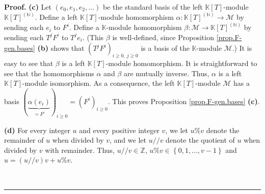 \documentclass[numbers=enddot,12pt,final,onecolumn,notitlepage]{scrartcl}%
\theoremstyle{definition}
\newenvironment{proof}[1][Proof]{\noindent\textbf{#1.} }{\ \rule{0.5em}{0.5em}}
\begin{document}
\begin{proof}
\textbf{(c)} Let $\left(  e_{0},e_{1},e_{2},\ldots\right)  $ be the standard
basis of the left $\mathbb{K}\left[  T\right]  $-module $\mathbb{K}\left[
T\right]  ^{\left(  \mathbb{N}\right)  }$. Define a left $\mathbb{K}\left[
T\right]  $-module homomorphism $\alpha:\mathbb{K}\left[  T\right]  ^{\left(
\mathbb{N}\right)  }\rightarrow\mathcal{M}$ by sending each $e_{i}$ to $F^{i}%
$. Define a $\mathbb{K}$-module homomorphism $\beta:\mathcal{M}\rightarrow
\mathbb{K}\left[  T\right]  ^{\left(  \mathbb{N}\right)  }$ by sending each
$T^{j}F^{i}$ to $T^{j}e_{i}$. (This $\beta$ is well-defined, since Proposition
\ref{prop.F-gen.bases} \textbf{(b)} shows that $\left(  T^{j}F^{i}\right)
_{i\geq0,\ j\geq0}$ is a basis of the $\mathbb{K}$-module $\mathcal{M}$.) It
is easy to see that $\beta$ is a left $\mathbb{K}\left[  T\right]  $-module
homomorphism. It is straightforward to see that the homomorphisms $\alpha$ and
$\beta$ are mutually inverse. Thus, $\alpha$ is a left $\mathbb{K}\left[
T\right]  $-module isomorphism. As a consequence, the left $\mathbb{K}\left[
T\right]  $-module $\mathcal{M}$ has a basis $\left(  \underbrace{\alpha
\left(  e_{i}\right)  }_{=F^{i}}\right)  _{i\geq0}=\left(  F^{i}\right)
_{i\geq0}$. This proves Proposition \ref{prop.F-gen.bases} \textbf{(c)}.

\textbf{(d)} For every integer $u$ and every positive integer $v$, we let
$u\%v$ denote the remainder of $u$ when divided by $v$, and we let $u//v$
denote the quotient of $u$ when divided by $v$ with remainder. Thus,
$u//v\in\mathbb{Z}$, $u\%v\in\left\{  0,1,\ldots,v-1\right\}  $ and $u=\left(
u//v\right)  v+u\%v$.


\end{proof}
\end{document}
